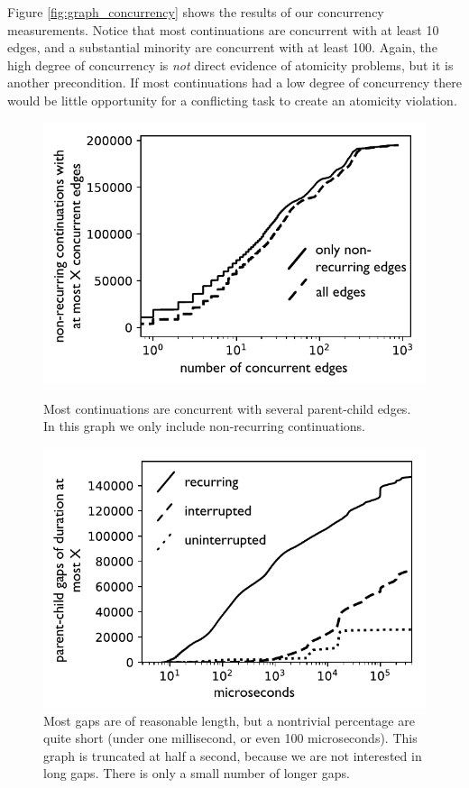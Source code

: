 \documentclass[acmsmall,anonymous,review]{acmart}\settopmatter{printfolios=true,printccs=false,printacmref=false}
\begin{document}
Figure \ref{fig:graph_concurrency} shows the results of our concurrency measurements.
Notice that most continuations are concurrent with at least 10 edges, and a substantial minority are concurrent with at least 100.
Again, the high degree of concurrency is \emph{not} direct evidence of atomicity problems, but it is another precondition.
If most continuations had a low degree of concurrency there would be little opportunity for a conflicting task to create an atomicity violation.

\begin{figure}
    \centering
    \begin{minipage}[t]{0.47\textwidth}
        \centering
        \includegraphics[width=1.0\textwidth]{Graphs/concurrency_bw}
        \caption{Most continuations are concurrent with several parent-child edges.
        In this graph we only include non-recurring continuations.}
        \label{fig:graph_concurrency}
    \end{minipage}\hfill
    \begin{minipage}[t]{0.47\textwidth}
        \centering
        \includegraphics[width=1.0\textwidth]{Graphs/gaps_bw}
        \caption{Most gaps are of reasonable length, but a nontrivial percentage are quite short (under one millisecond, or even 100 microseconds).
  This graph is truncated at half a second, because we are not interested in long gaps.
  There is only a small number of longer gaps.}
        \label{fig:graph_gaps}
    \end{minipage}
\end{figure}
\end{document}

